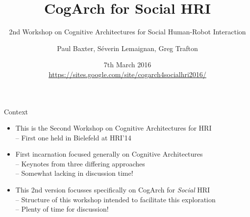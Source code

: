 \documentclass[compress]{beamer}
\title{CogArch for Social HRI}
\subtitle{2nd Workshop on Cognitive Architectures for Social Human-Robot
Interaction}
\date{7th March 2016\\ {\tiny \url{https://sites.google.com/site/cogarch4socialhri2016/}}}
\author{\scriptsize Paul Baxter, Séverin Lemaignan, Greg Trafton}
\institute{\texttt{[image: plymouth-logo]}}
\begin{document}

\maketitle



\begin{frame}{Context}

	\begin{itemize}
	
	\item<1-> This is the Second Workshop on Cognitive Architectures for HRI \\ {\footnotesize -- First one held in Bielefeld at HRI'14}
	
	\item<2-> First incarnation focused generally on Cognitive Architectures \\ {\footnotesize -- Keynotes from three differing approaches \\-- Somewhat lacking in discussion time!}
	
	\item<3-> This 2nd version focusses specifically on CogArch for \emph{Social} HRI \\ {\footnotesize -- Structure of this workshop intended to facilitate this exploration \\-- Plenty of time for discussion!}
	
	\end{itemize}

\end{frame}
\end{document}
